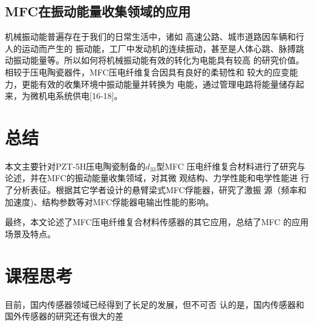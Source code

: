 \documentclass[lang=cn,11pt,a4paper,cite=authoryear]{elegantpaper}
\begin{document}
\subsection{MFC在振动能量收集领域的应用}
机械振动能普遍存在于我们的日常生活中，诸如
高速公路、城市道路因车辆和行人的运动而产生的
振动能，工厂中发动机的连续振动，甚至是人体心跳、脉搏跳
动振动能量等。所以如何将机械振动能有效的转化为电能具有较高
的研究价值。相较于压电陶瓷器件，MFC压电纤维复合因具有良好的柔韧性和
较大的应变能力，更能有效的收集环境中振动能量并转换为
电能，通过管理电路将能量储存起来，为微机电系统供电[16-18]。


\section{总结}

本文主要针对PZT-5H压电陶瓷制备的$d_{33}$型MFC
压电纤维复合材料进行了研究与论述，并在MFC的振动能量收集领域，对其微
观结构、力学性能和电学性能进
行了分析表征。根据其它学者设计的悬臂梁式MFC俘能器，研究了激振
源（频率和加速度)、结构参数等对MFC俘能器电输出性能的影响。

最终，本文论述了MFC压电纤维复合材料传感器的其它应用，总结了MFC
的应用场景及特点。



\section{课程思考}
目前，国内传感器领域已经得到了长足的发展，但不可否
认的是，国内传感器和国外传感器的研究还有很大的差




\clearpage
\end{document}
